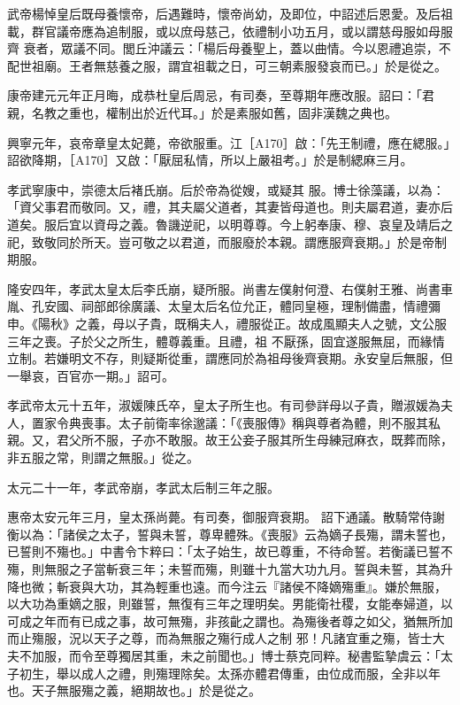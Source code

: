 \begin{pinyinscope}
 武帝楊悼皇后既母養懷帝，后遇難時，懷帝尚幼，及即位，中詔述后恩愛。及后祖載，群官議帝應為追制服，或以庶母慈己，依禮制小功五月，或以謂慈母服如母服齊
 衰者，眾議不同。閭丘沖議云：「楊后母養聖上，蓋以曲情。今以恩禮追崇，不配世祖廟。王者無慈養之服，謂宜祖載之日，可三朝素服發哀而已。」於是從之。



 康帝建元元年正月晦，成恭杜皇后周忌，有司奏，至尊期年應改服。詔曰：「君親，名教之重也，權制出於近代耳。」於是素服如舊，固非漢魏之典也。



 興寧元年，哀帝章皇太妃薨，帝欲服重。江［A170］啟：「先王制禮，應在緦服。」詔欲降期，［A170］又啟：「厭屈私情，所以上嚴祖考。」於是制緦麻三月。



 孝武寧康中，崇德太后褚氏崩。后於帝為從嫂，或疑其
 服。博士徐藻議，以為：「資父事君而敬同。又，禮，其夫屬父道者，其妻皆母道也。則夫屬君道，妻亦后道矣。服后宜以資母之義。魯譏逆祀，以明尊尊。今上躬奉康、穆、哀皇及靖后之祀，致敬同於所天。豈可敬之以君道，而服廢於本親。謂應服齊衰期。」於是帝制期服。



 隆安四年，孝武太皇太后李氏崩，疑所服。尚書左僕射何澄、右僕射王雅、尚書車胤、孔安國、祠部郎徐廣議、太皇太后名位允正，體同皇極，理制備盡，情禮彌申。《陽秋》之義，母以子貴，既稱夫人，禮服從正。故成風顯夫人之號，文公服三年之喪。子於父之所生，體尊義重。且禮，祖
 不厭孫，固宜遂服無屈，而緣情立制。若嫌明文不存，則疑斯從重，謂應同於為祖母後齊衰期。永安皇后無服，但一舉哀，百官亦一期。」詔可。



 孝武帝太元十五年，淑媛陳氏卒，皇太子所生也。有司參詳母以子貴，贈淑媛為夫人，置家令典喪事。太子前衛率徐邈議：「《喪服傳》稱與尊者為體，則不服其私親。又，君父所不服，子亦不敢服。故王公妾子服其所生母練冠麻衣，既葬而除，非五服之常，則謂之無服。」從之。



 太元二十一年，孝武帝崩，孝武太后制三年之服。



 惠帝太安元年三月，皇太孫尚薨。有司奏，御服齊衰期。
 詔下通議。散騎常侍謝衡以為：「諸侯之太子，誓與未誓，尊卑體殊。《喪服》云為嫡子長殤，謂未誓也，已誓則不殤也。」中書令卞粹曰：「太子始生，故已尊重，不待命誓。若衡議已誓不殤，則無服之子當斬衰三年；未誓而殤，則雖十九當大功九月。誓與未誓，其為升降也微；斬衰與大功，其為輕重也遠。而今注云『諸侯不降嫡殤重』。嫌於無服，以大功為重嫡之服，則雖誓，無復有三年之理明矣。男能衛社稷，女能奉婦道，以可成之年而有已成之事，故可無殤，非孩齔之謂也。為殤後者尊之如父，猶無所加而止殤服，況以天子之尊，而為無服之殤行成人之制
 邪！凡諸宜重之殤，皆士大夫不加服，而令至尊獨居其重，未之前聞也。」博士蔡克同粹。秘書監摯虞云：「太子初生，舉以成人之禮，則殤理除矣。太孫亦體君傳重，由位成而服，全非以年也。天子無服殤之義，絕期故也。」於是從之。




\end{pinyinscope}
